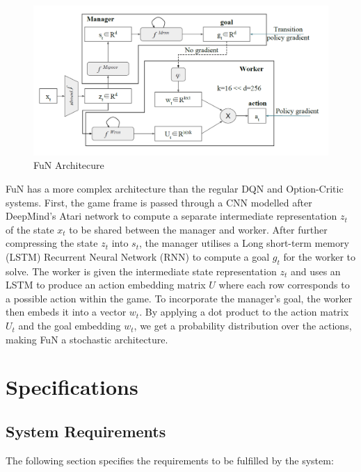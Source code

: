 \documentclass[notitlepage,a4paper,11pt]{article}
\begin{document}
\begin{figure}[!htb]
\centering
\includegraphics[width=.75\linewidth]{figs/fun_architecture.png}
\caption{FuN Architecure \protect\cite{vezhnevets2017feudal}} \label{fig:4}
\end{figure}

FuN has a more complex architecture than the regular DQN and Option-Critic systems. First, the game frame is passed through a CNN modelled after DeepMind's Atari \cite{DBLP:journals/corr/MnihKSGAWR13} network to compute a separate intermediate representation $z_t$ of the state $x_t$ to be shared between the manager and worker. After further compressing the state $z_t$ into $s_t$, the manager utilises a Long short-term memory (LSTM) Recurrent Neural Network (RNN) to compute a goal $g_t$ for the worker to solve. The worker is given the intermediate state representation $z_t$ and uses an LSTM to produce an action embedding matrix $U$ where each row corresponds to a possible action within the game. To incorporate the manager's goal, the worker then embeds it into a vector $w_t$. By applying a dot product to the action matrix $U_t$ and the goal embedding $w_t$, we get a probability distribution over the actions, making FuN a stochastic architecture. 

\section{Specifications}

\subsection{System Requirements}
The following section specifies the requirements to be fulfilled by the system:
\end{document}
